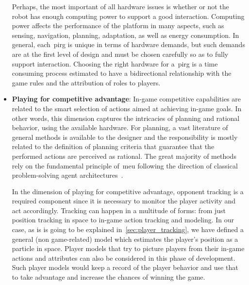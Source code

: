 \begin{itemize}[leftmargin=*,labelsep=5.8mm]
Perhaps, the most important of all hardware issues is whether or not the robot has enough computing power to support a good interaction. Computing power affects the performance of the platform in many aspects, such as sensing, navigation, planning, adaptation, as well as energy consumption. In general, each~\gls{pirg} is unique in terms of hardware demands, but such demands are at the first level of design and must be chosen carefully so as to fully support interaction. Choosing the right hardware for a~\gls{pirg} is a time consuming process estimated to have a bidirectional relationship with the game rules and the attribution of roles to players.

\item \textbf{Playing for competitive advantage}: In-game competitive capabilities are related to the smart selection of actions aimed at achieving in-game goals. In other words, this dimension captures the intricacies of planning and rational behavior, using the available hardware. %
For planning, a vast literature of general methods is available to the designer and the responsibility is mostly related to the definition of planning criteria that guarantee that the performed actions are perceived as rational. The great majority of methods rely on the fundamental principle of~\gls{meu} following the direction of classical problem-solving agent architectures~\citep{russell_artificial_2009}.

In the dimension of playing for competitive advantage, opponent tracking is a required component since it is necessary to monitor the player activity and act accordingly. Tracking can happen in a multitude of forms: from just position tracking in space to in-game action tracking and modeling. In our case, as is is going to be explained in~\ref{sec:player_tracking}, we have defined a general (non game-related) model which estimates the player's position as a particle in space. Player models that try to picture players from their in-game actions and attributes can also be considered in this phase of development. Such player models would keep a record of the player behavior and use that to take advantage and increase the chances of winning the game.


\end{itemize}
